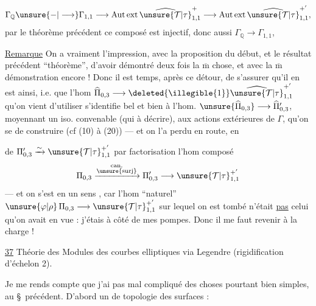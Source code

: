 
\[
\Gamma_{\mathbb Q}\unsure{-|\longrightarrow}\Gamma_{1,1}
\longrightarrow \operatorname{Aut\,ext}\widehat{\unsure{\mathcal T|\tau}}_{1,1}^{+}
\longrightarrow \operatorname{Aut\,ext}\widehat{\unsure{\mathcal T|\tau}}_{1,1}^{+'},
\]
par le théorème précédent ce composé est injectif, donc aussi
$\Gamma_{\mathbb Q}\longrightarrow\Gamma_{1,1}$, 

\uline{Remarque} On a vraiment l'impression, avec la proposition du début, et
le résultat précédent  ``théorème'', d'avoir démontré deux fois
la $\overline{\mathrm m}$ chose, et avec la $\overline{\mathrm m}$ démonstration
encore ! Donc il est temps, après ce détour, de s'assurer qu'il en est
 ainsi, i.e. que l'hom
$\widehat{\Pi}_{0,3}\longrightarrow\deleted{\illegible{1}}
\widehat{\unsure{\mathcal T|\tau}}_{1,1}^{+'}$ qu'on vient d'utiliser
s'identifie bel et bien à l'hom.
$\unsure{\widehat{\Pi}_{0,3}}\longrightarrow\widehat{\Pi}'_{0,3}$,
moyennant un iso. convenable (qui  à décrire),
 aux actions extérieures de $\Gamma$,
qu'on se  de construire (cf (10) à (20)) --- et on l'a
perdu en route, en


 de 
$\Pi'_{0,3}\xrightarrow{\sim}\unsure{\mathcal T|\tau}_{1,1}^{+'}$ par
factorisation  l'hom composé
\[
\Pi_{0,3}\xrightarrow{\substack{\mathrm{can.}\\\unsure{\mathrm{surj}}}}
\Pi'_{0,3}\longrightarrow\unsure{\mathcal T|\tau}_{1,1}^{+'}
\]
--- et on s'est en un sens , car l'hom ``naturel''
$\unsure{\varphi|\rho}\,\Pi_{0,3}\longrightarrow\unsure{\mathcal T|\tau}_{1,1}^{+'}$
sur lequel on est tombé n'était \uline{pas}  celui qu'on avait
en vue : j'étais à côté de mes pompes. Donc il me faut revenir à la charge !


\uline{37} Théorie des Modules des courbes elliptiques via Legendre
(rigidification d'échelon 2).

Je me rends compte que j'ai pas mal compliqué des choses pourtant bien
simples, au \S\ précédent. D'abord un  de topologie des surfaces :

